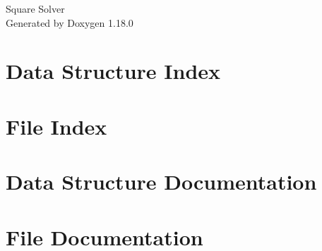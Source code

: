 \documentclass[twoside]{book}
\newcommand{\+}{\discretionary{\mbox{\scriptsize$\hookleftarrow$}}{}{}}
\newcommand{\clearemptydoublepage}{%
    \newpage{\pagestyle{empty}\cleardoublepage}%
  }
\begin{document}
  \raggedbottom
    \hypersetup{pageanchor=false,
                bookmarksnumbered=true,
                pdfencoding=unicode
               }
  \begin{titlepage}
  \vspace*{7cm}
  \begin{center}%
  {\Large Square Solver}\\
  \vspace*{1cm}
  {\large Generated by Doxygen 1.18.0}\\
  \end{center}
  \end{titlepage}
  \clearemptydoublepage
  \tableofcontents
  \clearemptydoublepage
  \hypersetup{pageanchor=true}
\chapter{Data Structure Index}

\chapter{File Index}

\chapter{Data Structure Documentation}


\chapter{File Documentation}











  \backmatter
  \newpage
  \clearemptydoublepage
  \printindex
\end{document}
